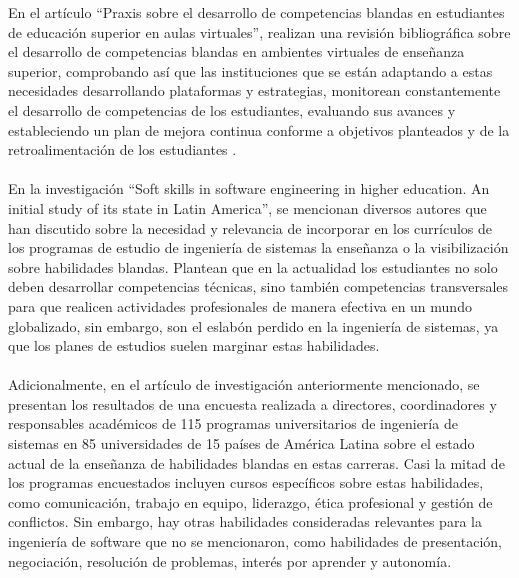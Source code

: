 En el artículo “Praxis sobre el desarrollo de competencias blandas en estudiantes de educación superior en aulas virtuales”, realizan una revisión bibliográfica sobre el desarrollo de competencias blandas en ambientes virtuales de enseñanza superior, comprobando así que las instituciones que se están adaptando a estas necesidades desarrollando plataformas y estrategias, monitorean constantemente el desarrollo de competencias de los estudiantes, evaluando sus avances y estableciendo un plan de mejora continua conforme a objetivos planteados y de la retroalimentación de los estudiantes \cite{CepedaGuerra2021}.
\\
\\
En la investigación “Soft skills in software engineering in higher education. An initial study of its state in Latin America”, se mencionan diversos autores que han discutido sobre la necesidad y relevancia de incorporar en los currículos de los programas de estudio de ingeniería de sistemas la enseñanza o la visibilización sobre habilidades blandas. Plantean que en la actualidad los estudiantes no solo deben desarrollar competencias técnicas, sino también competencias transversales para que realicen actividades profesionales de manera efectiva en un mundo globalizado, sin embargo, son el eslabón perdido en la ingeniería de sistemas, ya que los planes de estudios suelen marginar estas habilidades.
\\
\\
Adicionalmente, en el artículo de investigación anteriormente mencionado, se presentan los resultados de una encuesta realizada a directores, coordinadores y responsables académicos de 115 programas universitarios de ingeniería de sistemas en 85 universidades de 15 países de América Latina sobre el estado actual de la enseñanza de habilidades blandas en estas carreras. Casi la mitad de los programas encuestados incluyen cursos específicos sobre estas habilidades, como comunicación, trabajo en equipo, liderazgo, ética profesional y gestión de conflictos. Sin embargo, hay otras habilidades consideradas relevantes para la ingeniería de software que no se mencionaron, como habilidades de presentación, negociación, resolución de problemas, interés por aprender y autonomía.